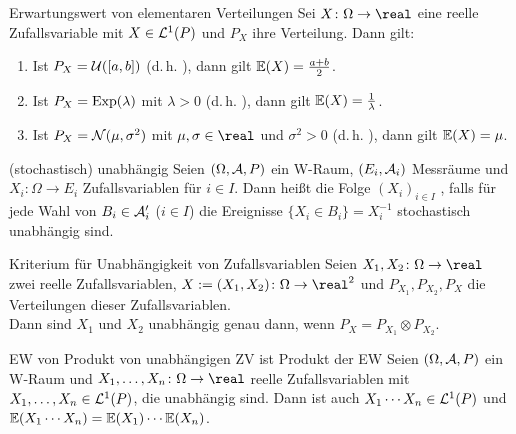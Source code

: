 \begin{Satz}{Erwartungswert von elementaren Verteilungen}
    Sei $X\colon \Omega \rightarrow \real$ eine reelle Zufallsvariable mit $X \in \mathcal{L}^1(P)$
    und $P_X$ ihre Verteilung.
    Dann gilt:
    \begin{enumerate}
        \item
        Ist $P_X = \mathcal{U}([a, b])$ (d.\,h. ),
        dann gilt $\mathbb{E}(X) = \frac{a + b}{2}$.
        
        \item
        Ist $P_X = \text{Exp}(\lambda)$ mit $\lambda > 0$ (d.\,h. ),
        dann gilt $\mathbb{E}(X) = \frac{1}{\lambda}$.
        
        \item
        Ist $P_X = \mathcal{N}(\mu, \sigma^2)$ mit $\mu, \sigma \in \real$ und $\sigma^2 > 0$
        (d.\,h. ),
        dann gilt $\mathbb{E}(X) = \mu$.
    \end{enumerate}
\end{Satz}

\linie

\begin{Def}{(stochastisch) unabhängig}
    Seien $(\Omega, \mathcal{A}, P)$ ein W-Raum, $(E_i, \mathcal{A}_i)$ Messräume und\\
    $X_i\colon \Omega \rightarrow E_i$ Zufallsvariablen für $i \in I$.
    Dann heißt die Folge $(X_i)_{i \in I}$ , falls
    für jede Wahl von $B_i \in \mathcal{A}_i'$ ($i \in I$)
    die Ereignisse $\{X_i \in B_i\} = X_i^{-1}$ stochastisch unabhängig sind.
\end{Def}

\begin{Lemma}{Kriterium für Unabhängigkeit von Zufallsvariablen}
    Seien $X_1, X_2\colon \Omega \rightarrow \real$ zwei reelle Zufallsvariablen,
    $X := (X_1, X_2)\colon \Omega \rightarrow \real^2$ und
    $P_{X_1}, P_{X_2}, P_X$ die Verteilungen dieser Zufallsvariablen.\\
    Dann sind $X_1$ und $X_2$ unabhängig genau dann, wenn $P_X = P_{X_1} \otimes P_{X_2}$.
\end{Lemma}

\begin{Satz}{EW von Produkt von unabhängigen ZV ist Produkt der EW}
    Seien $(\Omega, \mathcal{A}, P)$ ein W-Raum und $X_1, \dotsc, X_n\colon \Omega \rightarrow \real$
    reelle Zufallsvariablen mit $X_1, \dotsc, X_n \in \mathcal{L}^1(P)$, die unabhängig sind.
    Dann ist auch $X_1 \dotsm X_n \in \mathcal{L}^1(P)$ und
    $\mathbb{E}(X_1 \dotsm X_n) = \mathbb{E}(X_1) \dotsm \mathbb{E}(X_n)$.
\end{Satz}

